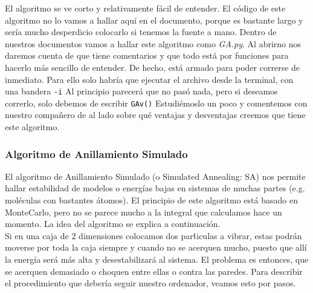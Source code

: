 \documentclass[10pt,letterpaper]{article}
\newcommand{\inlinecode}[1]{
\colorbox{light-gray}{\texttt{#1}}
}
\begin{document}
El algoritmo se ve corto y relativamente f\'acil de entender. El c\'odigo de este algoritmo no lo vamos a hallar aqu\'i en el documento, porque es bastante largo y ser\'ia mucho desperdicio colocarlo si tenemos la fuente a mano. Dentro de nuestros documentos vamos a hallar este algoritmo como \textit{GA.py}. Al abrirno nos daremos cuenta de que tiene comentarios y que todo est\'a por funciones para hacerlo m\'as sencillo de entender. De hecho, est\'a armado para poder correrse de inmediato. Para ello solo habr\'ia que ejecutar el archivo desde la terminal, con una bandera \inlinecode{-i} Al principio parecer\'a que no pas\'o nada, pero si deseamos correrlo, solo debemos de escribir \inlinecode{GAv()} Estudi\'emoslo un poco y comentemos con nuestro compa\~nero de al lado sobre qu\'e ventajas y desventajas creemos que tiene este algoritmo.

\subsubsection{Algoritmo de Anillamiento Simulado}
El algoritmo de Anillamiento Simulado (o Simulated Annealing: SA) nos permite hallar estabilidad de modelos o energ\'ias bajas en sistemas de muchas partes (e.g. mol\'eculas con bastantes \'atomos). El principio de este algoritmo est\'a basado en MonteCarlo, pero no se parece mucho a la integral que calculamos hace un momento. La idea del algoritmo se explica a continuaci\'on.\\

Si en una caja de 2 dimensiones colocamos dos par\'ticulas a vibrar, estas podr\'an moverse por toda la caja siempre y cuando no se acerquen mucho, puesto que all\'i la energ\'ia ser\'a m\'as alta y desestabilizar\'a al sistema. El problema es entonces, que se acerquen demasiado o choquen entre ellas o contra las paredes. Para describir el procedimiento que deber\'ia seguir nuestro ordenador, veamos esto por pasos.
\end{document}
